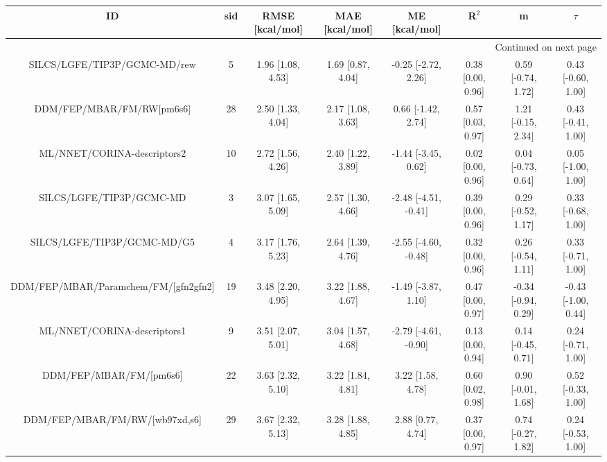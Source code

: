 \documentclass[8pt]{article}
\begin{document}
\begin{center}
\begin{footnotesize}
\begin{longtable}{|cccccccc|}
\toprule
                                       ID & sid &     RMSE [kcal/mol] &      MAE [kcal/mol] &         ME [kcal/mol] &              R$^2$ &                    m &               $\tau$ \\
\midrule
\endhead
\midrule
\multicolumn{8}{r}{{Continued on next page}} \\
\midrule
\endfoot

\bottomrule
\endlastfoot
             SILCS/LGFE/TIP3P/GCMC-MD/rew &   5 &   1.96 [1.08, 4.53] &   1.69 [0.87, 4.04] &   -0.25 [-2.72, 2.26] &  0.38 [0.00, 0.96] &   0.59 [-0.74, 1.72] &   0.43 [-0.60, 1.00] \\
                DDM/FEP/MBAR/FM/RW[pm6s6] &  28 &   2.50 [1.33, 4.04] &   2.17 [1.08, 3.63] &    0.66 [-1.42, 2.74] &  0.57 [0.03, 0.97] &   1.21 [-0.15, 2.34] &   0.43 [-0.41, 1.00] \\
              ML/NNET/CORINA-descriptors2 &  10 &   2.72 [1.56, 4.26] &   2.40 [1.22, 3.89] &   -1.44 [-3.45, 0.62] &  0.02 [0.00, 0.96] &   0.04 [-0.73, 0.64] &   0.05 [-1.00, 1.00] \\
                 SILCS/LGFE/TIP3P/GCMC-MD &   3 &   3.07 [1.65, 5.09] &   2.57 [1.30, 4.66] &  -2.48 [-4.51, -0.41] &  0.39 [0.00, 0.96] &   0.29 [-0.52, 1.17] &   0.33 [-0.68, 1.00] \\
              SILCS/LGFE/TIP3P/GCMC-MD/G5 &   4 &   3.17 [1.76, 5.23] &   2.64 [1.39, 4.76] &  -2.55 [-4.60, -0.48] &  0.32 [0.00, 0.96] &   0.26 [-0.54, 1.11] &   0.33 [-0.71, 1.00] \\
     DDM/FEP/MBAR/Paramchem/FM/[gfn2gfn2] &  19 &   3.48 [2.20, 4.95] &   3.22 [1.88, 4.67] &   -1.49 [-3.87, 1.10] &  0.47 [0.00, 0.97] &  -0.34 [-0.94, 0.29] &  -0.43 [-1.00, 0.44] \\
              ML/NNET/CORINA-descriptors1 &   9 &   3.51 [2.07, 5.01] &   3.04 [1.57, 4.68] &  -2.79 [-4.61, -0.90] &  0.13 [0.00, 0.94] &   0.14 [-0.45, 0.71] &   0.24 [-0.71, 1.00] \\
                  DDM/FEP/MBAR/FM/[pm6s6] &  22 &   3.63 [2.32, 5.10] &   3.22 [1.84, 4.81] &     3.22 [1.58, 4.78] &  0.60 [0.02, 0.98] &   0.90 [-0.01, 1.68] &   0.52 [-0.33, 1.00] \\
           DDM/FEP/MBAR/FM/RW/[wb97xd,s6] &  29 &   3.67 [2.32, 5.13] &   3.28 [1.88, 4.85] &     2.88 [0.77, 4.74] &  0.37 [0.00, 0.97] &   0.74 [-0.27, 1.82] &   0.24 [-0.53, 1.00] \\

\end{longtable}
\end{footnotesize}
\end{center}
\end{document}
